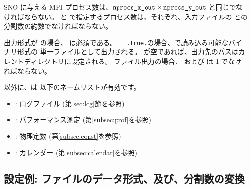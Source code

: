 SNO に与える MPI プロセス数は、$\nmitemeq{nprocs_x_out} \times \nmitemeq{nprocs_y_out}$ と同じでなければならない。
 と  で指定するプロセス数は、それぞれ、入力ファイルの \XDIR と\YDIR の分割数の約数でなければならない。


出力形式が \scalenetcdf の場合、 は必須である。
 = \verb|.true.|の場合、\grads で読み込み可能なバイナリ形式の
単一ファイルとして出力される。
が空であれば、出力先のパスはカレントディレクトリに設定される。
\grads ファイル出力の場合、 および  は 1 でなければならない。



以外に、\sno は 以下のネームリストが有効です。
%
\begin{itemize}
 \item {}: ログファイル (第\ref{sec:log}節を参照)
 \item {}: パフォーマンス測定 (第\ref{subsec:prof}を参照)
 \item {}: 物理定数 (第\ref{subsec:const}を参照)
 \item {}: カレンダー (第\ref{subsec:calendar}を参照)
\end{itemize}



\subsection{設定例: ファイルのデータ形式、及び、分割数の変換}

